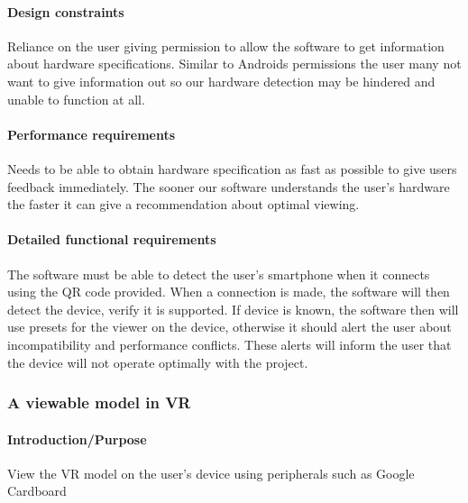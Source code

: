 \documentclass[letterpaper, 10pt, draftclsnofoot, compsoc, onecolumn]{IEEEtran}
\begin{document}
\paragraph[Design constraints]{\rmfamily\bfseries\color{black} Design
constraints }
{\color{black}
	Reliance on the user giving permission to allow the software to get information about hardware specifications. Similar to 
	Androids permissions the user many not want to give information out so our hardware detection may be hindered and 
	unable to function at all. 
}

\paragraph[Performance requirements]{\rmfamily\bfseries\color{black}
Performance requirements }
{\color{black}
	Needs to be able to obtain hardware specification as fast as possible to give users feedback immediately. The sooner 
	our software understands the user's hardware the faster it can give a recommendation about optimal viewing. 
}

\paragraph[Detailed functional requirements]{\rmfamily\bfseries\color{black}
Detailed functional requirements }
{\color{black}
	The software must be able to detect the user's smartphone when it connects using the QR code provided. When a 
	connection is made, the software will then detect the device, verify it is supported. If device is known, the software 
	then will use presets for the viewer on the device, otherwise it should alert the user about incompatibility and 
	performance conflicts. These alerts will inform the user that the device will not operate optimally with the project. 
}


\subsubsection[{Google Cardboard}]{\rmfamily\bfseries\color{black} 
	A viewable model in VR 
}
\smallskip
\paragraph[Introduction/Purpose of this
feature]{\rmfamily\bfseries\color{black}
Introduction/Purpose }
{\color{black}
	View the VR model on the user's device using peripherals such as Google Cardboard   
}
\end{document}
